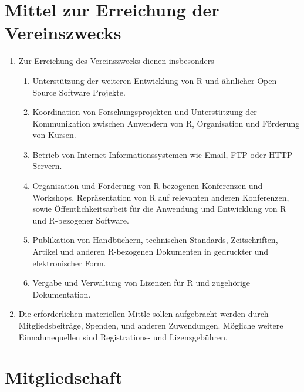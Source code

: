 \documentclass[a4paper]{article}
\begin{document}
\section{Mittel zur Erreichung der Vereinszwecks}

\begin{enumerate}
 \item Zur Erreichung des Vereinszwecks dienen insbesonders
  \begin{enumerate}
   \item Unterst{\"u}tzung der weiteren Entwicklung von R und {\"a}hnlicher
    Open Source Software Projekte. 
   \item Koordination von Forschungsprojekten und Unterst{\"u}tzung der
    Kommunikation zwischen Anwendern von R, Organisation und
    F{\"o}rderung von Kursen.
   \item Betrieb von Internet-Informationssystemen wie Email, FTP oder
    HTTP Servern.
   \item Organisation und F{\"o}rderung von R-bezogenen Konferenzen und
    Workshops, Repr{\"a}sentation von R auf relevanten anderen Konferenzen,
    sowie {\"O}ffentlichkeitsarbeit f{\"u}r die Anwendung und Entwicklung von
    R und R-bezogener Software.
   \item Publikation von Handb{\"u}chern, technischen Standards,
    Zeitschriften, Artikel und anderen R-bezogenen Dokumenten in
    gedruckter und elektronischer Form.
   \item Vergabe und Verwaltung von Lizenzen f{\"u}r R und zugeh{\"o}rige
    Dokumentation. 
  \end{enumerate}

 \item Die erforderlichen materiellen Mittle sollen aufgebracht werden
  durch Mitgliedsbeitr{\"a}ge, Spenden, und anderen Zuwendungen. M{\"o}gliche
  weitere Einnahmequellen sind Registrations- und Lizenzgeb{\"u}hren.
\end{enumerate}

\section{Mitgliedschaft}
\end{document}
